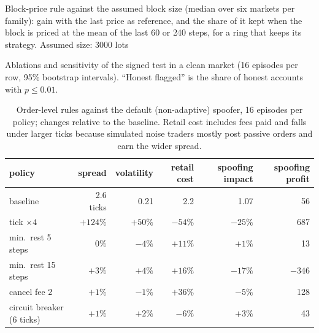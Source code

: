 \documentclass[pdflatex,sn-basic]{sn-jnl}
\theoremstyle{thmstyleone}%
\begin{document}
\begin{appendices}
\begin{table}[h]
\centering\footnotesize
{}
\caption{Block-price rule against the assumed block size (median over six markets per family): gain with the last price as reference, and the share of it kept when the block is priced at the mean of the last 60 or 240 steps, for a ring that keeps its strategy. Assumed size: 3000 lots}\label{tab:blocksize}
\end{table}

\begin{table}[h]
\centering\footnotesize
{}
\caption{Ablations and sensitivity of the signed test in a clean market (16 episodes per row, 95\% bootstrap intervals). ``Honest flagged'' is the share of honest accounts with $p\le0.01$.}\label{tab:ablation}
\end{table}

\begin{table}[h]
\centering\footnotesize
\begin{adjustbox}{max width=\linewidth}
\begin{tabular}{lrrrrr}
\toprule
policy & spread & volatility & retail cost & spoofing impact & spoofing profit\\
\midrule
baseline & 2.6 ticks & 0.21 & 2.2 & 1.07 & 56\\
tick $\times4$ & $+124\%$ & $+50\%$ & $-54\%$ & $-25\%$ & 687\\
min.\ rest 5 steps & $0\%$ & $-4\%$ & $+11\%$ & $+1\%$ & 13\\
min.\ rest 15 steps & $+3\%$ & $+4\%$ & $+16\%$ & $-17\%$ & $-346$\\
cancel fee 2 & $+1\%$ & $-1\%$ & $+36\%$ & $-5\%$ & 128\\
circuit breaker (6 ticks) & $+1\%$ & $+2\%$ & $-6\%$ & $+3\%$ & 43\\
\bottomrule
\end{tabular}
\end{adjustbox}
\caption{Order-level rules against the default (non-adaptive) spoofer, 16 episodes per policy; changes relative to the baseline. Retail cost includes fees paid and falls under larger ticks because simulated noise traders mostly post passive orders and earn the wider spread.}\label{tab:order}
\end{table}


\end{appendices}


\end{document}
